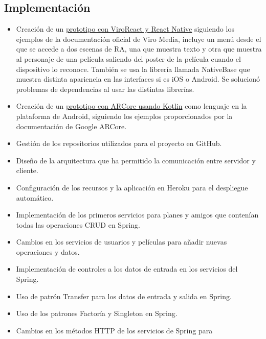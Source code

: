     \subsection{Implementación}
    \label{makereference7.2.3}
        \begin{itemize}
            \item Creación de un \href{https://github.com/DanielCalle/react-native-demo}{prototipo con ViroReact y React Native}
             siguiendo los ejemplos de la documentación oficial de Viro Media\cite{viroreact},
             incluye un menú desde el que se accede a dos escenas de RA, una
             que muestra texto y otra que muestra al personaje de una película
             saliendo del poster de la película cuando el
             dispositivo lo reconoce. También se usa la librería llamada NativeBase que
             muestra distinta apariencia en las interfaces si es iOS o Android.
             Se solucionó problemas de dependencias al usar las distintas librerías.
            \item Creación de un \href{https://github.com/DanielCalle/DemoARCore}{prototipo con ARCore usando Kotlin} como lenguaje
            en la plataforma de Android, siguiendo los ejemplos proporcionados por
            la documentación de Google ARCore\cite{arcore}.
            \item Gestión de los repositorios utilizados para el proyecto en 
            GitHub.
            \item Diseño de la arquitectura que ha permitido la comunicación
             entre servidor y cliente.
            \item Configuración de los recursos y la aplicación en Heroku para
             el despliegue automático. 
            \item Implementación de los primeros servicios para planes y amigos
             que contenían todas las operaciones CRUD en Spring.
            \item Cambios en los servicios de usuarios y películas para añadir
             nuevas operaciones y datos.
            \item Implementación de controles a los datos de entrada en los servicios del Spring.
            \item Uso de patrón Transfer para los datos de entrada y salida en Spring.
            \item Uso de los patrones Factoría y Singleton en Spring.
            \item Cambios en los métodos HTTP de los servicios de Spring para

\end{itemize}
